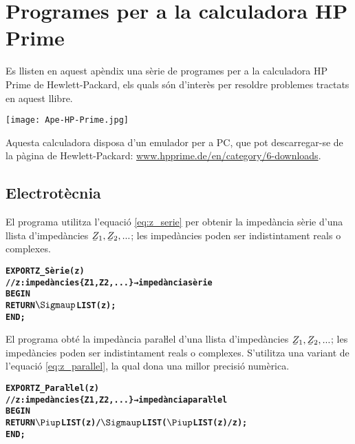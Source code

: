 \chapter{Programes per a la calculadora \textsf{HP Prime}}\label{sec:progs-HP}

Es llisten en aquest apèndix una sèrie de programes per a la calculadora \textsf{HP Prime} de Hewlett-Packard, els quals són d'interès per resoldre problemes tractats en aquest llibre.

\begin{center}
\texttt{[image: Ape-HP-Prime.jpg]}
\end{center}

Aquesta calculadora disposa d'un emulador per a PC, que pot descarregar-se de la pàgina de Hewlett-Packard: \href{http://www.hpprime.de/en/category/6-downloads}{www.hpprime.de/en/category/6-downloads}.

\section{Electrotècnia}\label{sec:HP_ELC}

El programa  utilitza l'equació \eqref{eq:z_serie} per obtenir la impedància sèrie d'una llista d'impedàncies $\cmplx{Z}_1, \cmplx{Z}_2, ...$; les impedàncies poden ser indistintament reals o complexes.
\vspace{-1cm}
\begin{alltt}
\bfseries
{}
    EXPORT Z_Sèrie(z)
    // z:impedàncies \{Z1, Z2, ...\} → impedància sèrie
    BEGIN
      RETURN \(\Sigmaup\)LIST(z);
    END;
\end{alltt}

El programa  obté la impedància paraŀlel  d'una llista d'impedàncies $\cmplx{Z}_1, \cmplx{Z}_2, ...$; les impedàncies poden ser indistintament reals o complexes. S'utilitza una variant de l'equació \eqref{eq:z_parallel}, la qual dona una millor precisió numèrica.
\vspace{-1cm}
\begin{alltt}
\bfseries
{}
    EXPORT Z_Paraŀlel(z)
    // z:impedàncies \{Z1, Z2, ...\} → impedància paraŀlel
    BEGIN
      RETURN \(\Piup\)LIST(z)/\(\Sigmaup\)LIST(\(\Piup\)LIST(z)/z);
    END;
\end{alltt}

